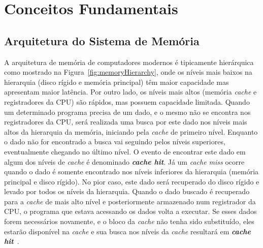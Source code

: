 \chapter{Conceitos Fundamentais}
\label{cap:conceitos_fundamentais}

\section{Arquitetura do Sistema de Memória}
\label{sec:conceitosFundamentaisArquitetura}

A arquitetura de memória de computadores modernos é tipicamente hierárquica como mostrado na Figura~\ref{fig:memoryHierarchy}, onde os níveis mais baixos na hierarquia (disco rígido e memória principal) têm maior capacidade mas apresentam maior latência.
Por outro lado, os níveis mais altos (memória \textit{cache} e registradores da CPU) são rápidos, mas possuem capacidade limitada.
Quando um determinado programa precisa de um dado, e o mesmo não se encontra nos registradores da CPU, será realizada uma busca por este dado nos níveis mais altos da hierarquia da memória, iniciando pela \textit{cache} de primeiro nível. Enquanto o dado não for encontrado a busca vai seguindo pelos níveis superiores, eventualmente chegando no último nível.
O evento de encontrar este dado em algum dos níveis de \textit{cache} é denominado \textbf{\textit{cache hit}}.
Já um \textit{cache miss} ocorre quando o dado é somente encontrado nos níveis inferiores da hierarquia (memória principal e disco rígido).
No pior caso, este dado será recuperado do disco rígido e levado por todos os níveis da hierarquia.
Quando o dado buscado é recuperado para a \textit{cache} de mais alto nível e posteriormente armazenado num registrador da CPU, o programa que estava acessando os dados volta a executar.
Se esses dados forem necessários novamente, e o bloco da \textit{cache} não tenha sido substituído, eles estarão disponível na \textit{cache} e sua busca nos níveis da \textit{cache} resultará em \textbf{\textit{cache hit}}~\cite{patterson2013computer}.

